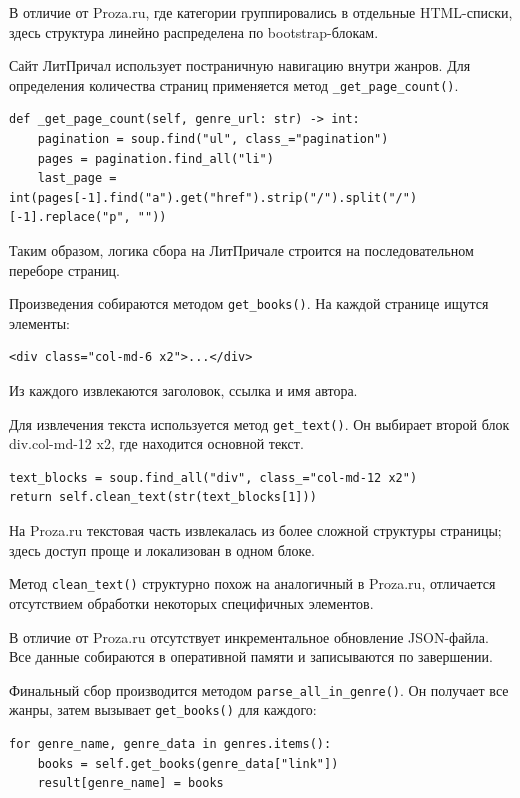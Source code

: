 \documentclass[coursework]{SCWorks}
\begin{document}
    В отличие от Proza.ru, где категории группировались в отдельные HTML-списки, здесь структура линейно распределена по bootstrap-блокам.


    Сайт ЛитПричал использует постраничную навигацию внутри жанров.
    Для определения количества страниц применяется метод \texttt{\_get\_page\_count()}.

    \begin{verbatim}
def _get_page_count(self, genre_url: str) -> int:
    pagination = soup.find("ul", class_="pagination")
    pages = pagination.find_all("li")
    last_page = int(pages[-1].find("a").get("href").strip("/").split("/")[-1].replace("p", ""))
    \end{verbatim}


    Таким образом, логика сбора на ЛитПричале строится на последовательном переборе страниц.


    Произведения собираются методом \texttt{get\_books()}.
    На каждой странице ищутся элементы:
    \begin{verbatim}
<div class="col-md-6 x2">...</div>
    \end{verbatim}


    Из каждого извлекаются заголовок, ссылка и имя автора.


    Для извлечения текста используется метод \texttt{get\_text()}.
    Он выбирает второй блок div.col-md-12 x2, где находится основной текст.

    \begin{verbatim}
text_blocks = soup.find_all("div", class_="col-md-12 x2")
return self.clean_text(str(text_blocks[1]))
    \end{verbatim}


    На Proza.ru текстовая часть извлекалась из более сложной структуры страницы; здесь доступ проще и локализован в одном блоке.


    Метод \texttt{clean\_text()} структурно похож на аналогичный в Proza.ru, отличается отсутствием обработки некоторых специфичных элементов.


    В отличие от Proza.ru отсутствует инкрементальное обновление JSON-файла.
    Все данные собираются в оперативной памяти и записываются по завершении.


    Финальный сбор производится методом \texttt{parse\_all\_in\_genre()}.
    Он получает все жанры, затем вызывает \texttt{get\_books()} для каждого:
    \begin{verbatim}
for genre_name, genre_data in genres.items():
    books = self.get_books(genre_data["link"])
    result[genre_name] = books
    \end{verbatim}
\end{document}
